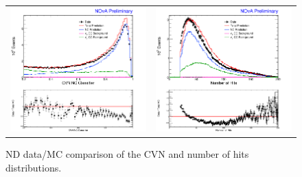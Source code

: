 \begin{figure}[p]
  \centering
  \begin{tabular}{c c}
    \includegraphics[width=.48\textwidth]{figures/NDDataMC/CVNNusNDRat.png} &
    \includegraphics[width=.48\textwidth]{figures/NDDataMC/NHitNusNDRat.png} \\
  \end{tabular}
  \caption[ND Data/MC Comparison: NC Selection Variable Distributions]{ND data/MC comparison of the CVN and number of hits distributions.}
  \label{fig:NDDataMCNCSel}
\end{figure}

